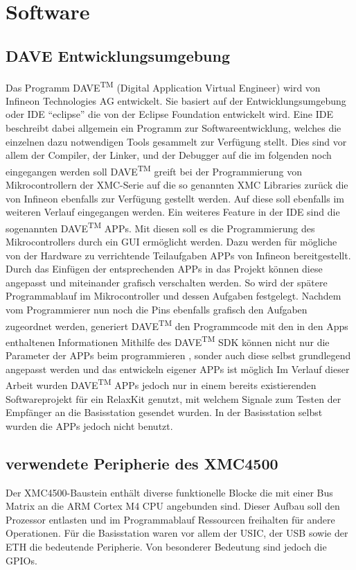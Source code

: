 \chapter{Software}
\label{sec:Software}
\pagestyle{scrheadings}
\section{DAVE Entwicklungsumgebung}

Das Programm DAVE\textsuperscript{TM} (Digital Application Virtual Engineer) wird von Infineon Technologies AG entwickelt. Sie basiert auf der Entwicklungsumgebung oder \ac{IDE} \enquote{eclipse} die von der Eclipse Foundation entwickelt wird. Eine \ac{IDE} beschreibt dabei allgemein ein Programm zur Softwareentwicklung, welches die einzelnen dazu notwendigen Tools gesammelt zur Verfügung stellt. Dies sind vor allem der Compiler, der Linker, und der Debugger auf die im folgenden noch eingegangen werden soll %
DAVE\textsuperscript{TM} greift bei der Programmierung von Mikrocontrollern der XMC-Serie auf die so genannten XMC Libraries zurück die von Infineon ebenfalls zur Verfügung gestellt werden.  Auf diese soll ebenfalls im weiteren Verlauf  eingegangen werden. Ein weiteres Feature in der \ac{IDE} sind die sogenannten DAVE\textsuperscript{TM} APPs. Mit diesen soll es die Programmierung des Mikrocontrollers durch ein \ac{GUI} ermöglicht werden. Dazu werden für  mögliche von der Hardware zu verrichtende Teilaufgaben APPs von Infineon bereitgestellt. Durch das Einfügen der entsprechenden APPs in das Projekt können diese angepasst und miteinander grafisch verschalten werden. So wird der spätere Programmablauf im Mikrocontroller und dessen Aufgaben festgelegt. Nachdem vom Programmierer nun noch die Pins ebenfalls grafisch den Aufgaben zugeordnet werden, generiert  DAVE\textsuperscript{TM}  den Programmcode mit den in den Apps enthaltenen Informationen%
Mithilfe des DAVE\textsuperscript{TM} \ac{SDK} können nicht nur die Parameter der APPs beim programmieren , sonder auch diese selbst grundlegend angepasst werden und das entwickeln eigener APPs ist möglich%
Im Verlauf dieser Arbeit wurden DAVE\textsuperscript{TM}  APPs jedoch nur in einem bereits existierenden Softwareprojekt für ein RelaxKit genutzt, mit welchem  Signale zum Testen der Empfänger an die Basisstation gesendet wurden. In der Basisstation selbst wurden die APPs jedoch nicht benutzt.


\section{verwendete Peripherie des XMC4500}
Der XMC4500-Baustein enthält diverse funktionelle Blocke die mit einer Bus Matrix an die ARM Cortex M4 \ac{CPU} angebunden sind. Dieser Aufbau soll den Prozessor entlasten und im Programmablauf Ressourcen freihalten für andere Operationen.%
Für die Basisstation waren vor allem der \ac{USIC}, der \ac{USB} sowie der \ac{ETH} die bedeutende Peripherie. Von besonderer Bedeutung sind jedoch die \acp{GPIO}. %
